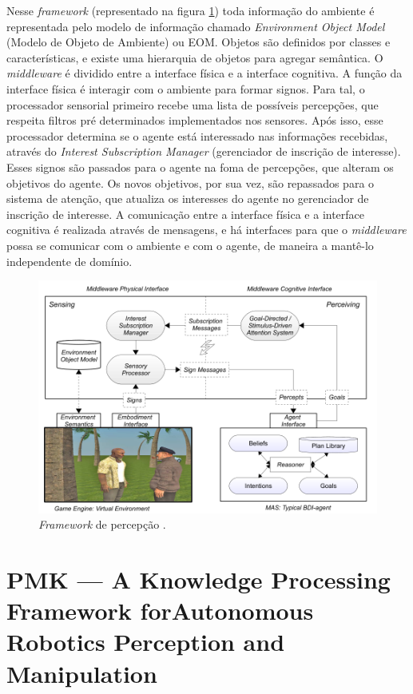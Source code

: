 Nesse \textit{framework} (representado na figura \ref{fig:bdiPerceptionModel}) toda informação do ambiente é representada pelo modelo de informação chamado \textit{Environment Object Model} (Modelo de Objeto de Ambiente) ou EOM. Objetos são definidos por classes e características, e existe uma hierarquia de objetos para agregar semântica. O \textit{middleware} é dividido entre a interface física e a interface cognitiva. A função da interface física é interagir com o ambiente para formar signos. Para tal, o processador sensorial primeiro recebe uma lista de possíveis percepções, que respeita filtros pré determinados implementados nos sensores. Após isso, esse processador determina se o agente está interessado nas informações recebidas, através do \textit{Interest Subscription Manager} (gerenciador de inscrição de interesse). Esses signos são passados para o agente na foma de percepções, que alteram os objetivos do agente. Os novos objetivos, por sua vez, são repassados para o sistema de atenção, que atualiza os interesses do agente no gerenciador de inscrição de interesse. A comunicação entre a interface física e a interface cognitiva é realizada através de mensagens, e há interfaces para que o \textit{middleware} possa se comunicar com o ambiente e com o agente, de maneira a mantê-lo independente de domínio. 

\begin{figure}[h!]
    \centering
    \includegraphics[width=\textwidth]{Images/bdiPerceptionModel.png}
    \caption{\textit{Framework} de percepção \cite{van2011scalable}.}
    \label{fig:bdiPerceptionModel}
\end{figure}

\section{PMK — A Knowledge Processing Framework forAutonomous Robotics Perception and Manipulation \cite{Diab_2019}}

